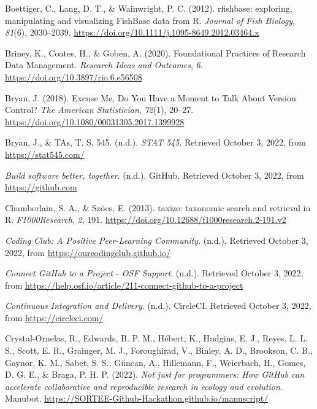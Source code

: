 \begin{CSLReferences}{1}{0}
\leavevmode{}%
Boettiger, C., Lang, D. T., \& Wainwright, P. C. (2012). rfishbase: exploring, manipulating and visualizing FishBase data from R. \emph{Journal of Fish Biology}, \emph{81}(6), 2030--2039. \url{https://doi.org/10.1111/j.1095-8649.2012.03464.x}

\leavevmode{}%
Briney, K., Coates, H., \& Goben, A. (2020). Foundational Practices of Research Data Management. \emph{Research Ideas and Outcomes}, \emph{6}. \url{https://doi.org/10.3897/rio.6.e56508}

\leavevmode{}%
Bryan, J. (2018). Excuse Me, Do You Have a Moment to Talk About Version Control? \emph{The American Statistician}, \emph{72}(1), 20--27. \url{https://doi.org/10.1080/00031305.2017.1399928}

\leavevmode{}%
Bryan, J., \& TAs, T. S. 545. (n.d.). \emph{STAT 545}. Retrieved October 3, 2022, from \url{https://stat545.com/}

\leavevmode{}%
\emph{Build software better, together}. (n.d.). GitHub. Retrieved October 3, 2022, from \url{https://github.com}

\leavevmode{}%
Chamberlain, S. A., \& Szöcs, E. (2013). taxize: taxonomic search and retrieval in R. \emph{F1000Research}, \emph{2}, 191. \url{https://doi.org/10.12688/f1000research.2-191.v2}

\leavevmode{}%
\emph{Coding Club: A Positive Peer-Learning Community}. (n.d.). Retrieved October 3, 2022, from \url{https://ourcodingclub.github.io/}

\leavevmode{}%
\emph{Connect GitHub to a Project - OSF Support}. (n.d.). Retrieved October 3, 2022, from \url{https://help.osf.io/article/211-connect-github-to-a-project}

\leavevmode{}%
\emph{Continuous Integration and Delivery}. (n.d.). CircleCI. Retrieved October 3, 2022, from \url{https://circleci.com/}

\leavevmode{}%
Crystal-Ornelas, R., Edwards, B. P. M., Hébert, K., Hudgins, E. J., Reyes, L. L. S., Scott, E. R., Grainger, M. J., Foroughirad, V., Binley, A. D., Brookson, C. B., Gaynor, K. M., Sabet, S. S., Güncan, A., Hillemann, F., Weierbach, H., Gomes, D. G. E., \& Braga, P. H. P. (2022). \emph{Not just for programmers: How GitHub can accelerate collaborative and reproducible research in ecology and evolution}. Manubot. \url{https://SORTEE-Github-Hackathon.github.io/manuscript/}


\end{CSLReferences}
